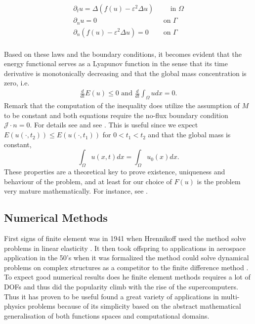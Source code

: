 \begin{equation}
\label{eq:strongch}
    \begin{split}
\partial _{t} u  = \Delta ( f( u)  - \varepsilon ^2 \Delta u ) &\quad \text{ in } \Omega  \\
\partial _{n} u = 0 \quad &\text{ on } \Gamma  \\
\partial _{n}(f( u)  - \varepsilon ^2 \Delta u )  = 0 \quad &\text{ on } \Gamma  \\
    \end{split}
\end{equation}

Based on these laws and the boundary conditions, it becomes evident that the energy functional serves as a Lyapunov function in the sense that its time derivative is monotonically decreasing and that the global mass concentration is zero, i.e.
\[
    \begin{split}
\frac{d}{dt} E( u)  \le  0 \text{ and }\frac{d}{dt} \int_{\Omega }^{}  u dx = 0.
    \end{split}
\]
Remark that the computation of the inequality does utilize the assumption of $M$ to be constant and both equations require the no-flux boundary condition $\mathcal{J} \cdot n = 0$.
For details see \cite[Equation 17 ]{lee2014physical} and see \cite[Equation 1.7]{garcke2020weak}.
This is useful since we expect $E( u( \cdot , t_{2}) ) \le  E( u( \cdot , t_{1}) ) $ for $0 < t_{1} < t_{2} $ and that the global mass is constant, \[
\int_{\Omega }^{} u ( x,t)  dx = \int_{\Omega }^{} u_{0}(x)  dx.
\]
These properties are a theoretical key to prove existence, uniqueness and behaviour of the problem, and at least for our choice of $F( u) $ is the problem very mature mathematically. For instance, see \cite{abels2007convergence, cherfils2011cahn,
elliott1986cahn}.

\subsection{Numerical Methods}%
\label{sub:numerical_methods}


First signs of finite element was in 1941 when Hrennikoff used the method solve problems in linear elasticity \cite{hrennikoff1941solution}. It then took offspring to applications in aerospace application in the 50's when it was formalized the method
could solve dynamical problems on complex structures as a competitor to the finite difference method
\cite{argyris1960energy, turner1956stiffness, liu2022eighty}. To expect good numerical results does he finite element methods requires a lot of DOFs and thus did the popularity climb with the rise of the supercomputers. Thus it has proven to be
useful found a great variety of applications in multi-physics problems because of its simplicity based on the abstract mathematical generalisation of both functions spaces and computational domains.

